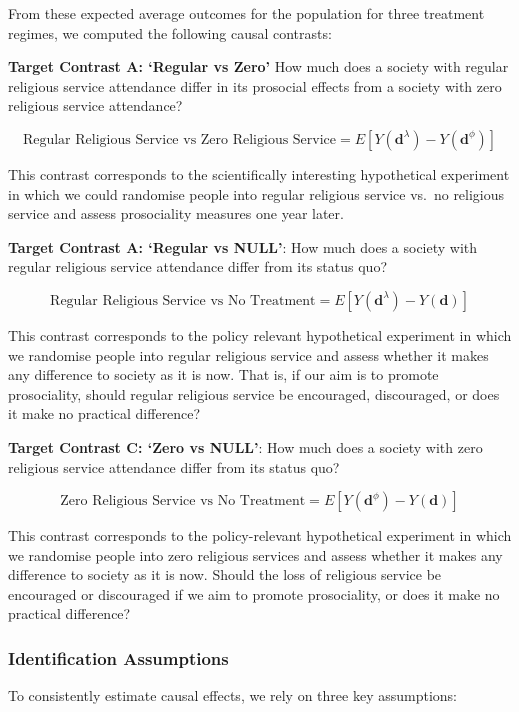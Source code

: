 \documentclass[
  single column]{article}
\begin{document}
From these expected average outcomes for the population for three
treatment regimes, we computed the following causal contrasts:

\textbf{Target Contrast A: `Regular vs Zero'} How much does a society
with regular religious service attendance differ in its prosocial
effects from a society with zero religious service attendance?

\[ \text{Regular Religious Service vs Zero Religious Service} = E[Y(\mathbf{d}^\lambda)- Y(\mathbf{d}^\phi)] \]

This contrast corresponds to the scientifically interesting hypothetical
experiment in which we could randomise people into regular religious
service vs.~no religious service and assess prosociality measures one
year later.

\textbf{Target Contrast A: `Regular vs NULL'}: How much does a society
with regular religious service attendance differ from its status quo?

\[ \text{Regular Religious Service vs  No Treatment} = E[Y(\mathbf{d}^\lambda)- Y(\mathbf{d})] \]

This contrast corresponds to the policy relevant hypothetical experiment
in which we randomise people into regular religious service and assess
whether it makes any difference to society as it is now. That is, if our
aim is to promote prosociality, should regular religious service be
encouraged, discouraged, or does it make no practical difference?

\textbf{Target Contrast C: `Zero vs NULL'}: How much does a society with
zero religious service attendance differ from its status quo?

\[ \text{Zero Religious Service vs No Treatment} = E[Y(\mathbf{d}^\phi)- Y(\mathbf{d})] \]

This contrast corresponds to the policy-relevant hypothetical experiment
in which we randomise people into zero religious services and assess
whether it makes any difference to society as it is now. Should the loss
of religious service be encouraged or discouraged if we aim to promote
prosociality, or does it make no practical difference?

\subsubsection{Identification
Assumptions}\label{identification-assumptions}

To consistently estimate causal effects, we rely on three key
assumptions:
\end{document}
